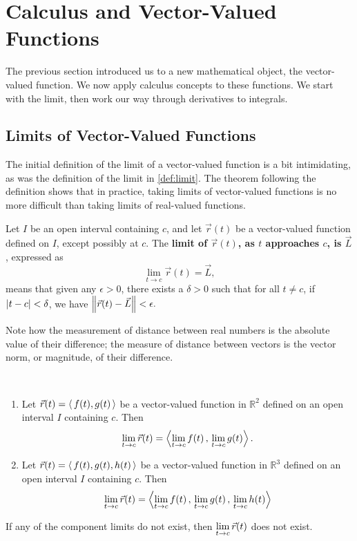 \section{Calculus and Vector-Valued Functions}\label{sec:vvf_calc}

The previous section introduced us to a new mathematical object, the vector-valued function. We now apply calculus concepts to these functions. We start with the limit, then work our way through derivatives to integrals.

\subsection{Limits of Vector-Valued Functions}

The initial definition of the limit of a vector-valued function is a bit intimidating, as was the definition of the limit in \autoref{def:limit}. The theorem following the definition shows that in practice, taking limits of vector-valued functions is no more difficult than taking limits of real-valued functions.

\begin{definition}\label{def:vvf_limit}%
Let $I$ be an open interval containing $c$, and let $\vec r(t)$ be a vector-valued function defined on $I$, except possibly at $c$. %
The \textbf{limit of $\vec r(t)$, as $t$ approaches $c$, is $\vec L$}, expressed as 
\[\lim_{t\to c} \vec r(t) = \vec L,\]
means that given any $\epsilon>0$, there exists a $\delta>0$ such that for all $t\neq c$, if $\left\lvert t-c \right\rvert<\delta$, we have $\left\lVert \vec r(t) - \vec L \right\rVert < \epsilon.$
\end{definition}

Note how the measurement of distance between real numbers is the absolute value of their difference; the measure of distance between vectors is the vector norm, or magnitude, of their difference.

\clearpage

\begin{theorem}\label{thm:vvf_limit}%
%
\mbox{}\\[-2\baselineskip]\parbox[t]{\linewidth}{\begin{enumerate}
	\item Let $\vec r(t) =\left\langle \,f(t),g(t)\,\right\rangle$ be a vector-valued function in $\mathbb{R}^2$ defined on an open interval $I$ containing $c$. Then
\[\lim_{t\to c} \vec r(t) =\left\langle \lim_{t\to c}f(t)\, , \,\lim_{t\to c} g(t)\right\rangle.\]
	\item Let $\vec r(t) =\left\langle \,f(t),g(t),h(t)\,\right\rangle$ be a vector-valued function in $\mathbb{R}^3$ defined on an open interval $I$ containing $c$. Then 
\[
\lim_{t\to c} \vec r(t)
=\left\langle \lim_{t\to c}f(t)\, , \,\lim_{t\to c} g(t)\,, \,\lim_{t\to c} h(t)\right\rangle
\]
\end{enumerate}}
If any of the component limits do not exist, then $\displaystyle\lim_{t\to c} \vec r(t)$ does not exist.
\end{theorem}

